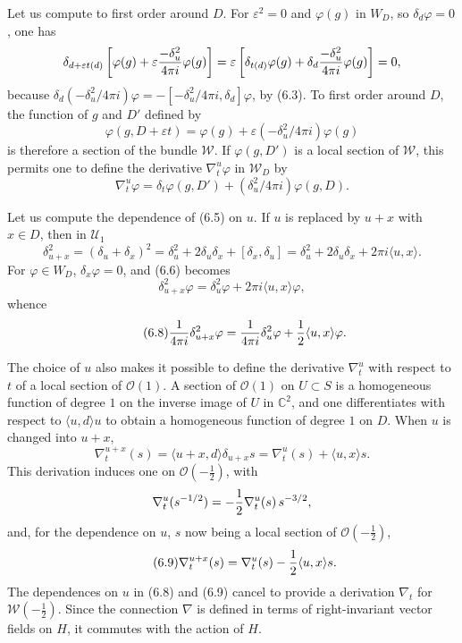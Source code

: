 \documentclass[11pt]{article}
\newcommand{\C}{\mathbb C}
\newcommand{\cO}{\mathcal O}
\newcommand{\cW}{\mathcal W}
\newcommand{\half}{\tfrac12}
\begin{document}
Let us compute to first order around $D$. For $\varepsilon^2=0$ and $\varphi(g)$ in $W_D$, so $\delta_d\varphi=0$, one has
\[
\delta_{d+\varepsilon t(d)}\left[\varphi(g)+\varepsilon{-\delta_u^2\over4\pi i}\varphi(g)\right]
=\varepsilon\left[\delta_{t(d)}\varphi(g)+\delta_d{-\delta_u^2\over4\pi i}\varphi(g)\right]=0,
\]
because $\delta_d(-\delta_u^2/4\pi i)\varphi=-[-\delta_u^2/4\pi i,\delta_d]\varphi$, by (6.3). To first order around $D$, the function of $g$ and $D'$ defined by
\[
\varphi(g,D+\varepsilon t)=\varphi(g)+\varepsilon(-\delta_u^2/4\pi i)\varphi(g)
\]
is therefore a section of the bundle $\cW$. If $\varphi(g,D')$ is a local section of $\cW$, this permits one to define the derivative $\nabla^u_t\varphi$ in $\cW_D$ by
\begin{equation}\tag{6.5}
\nabla^u_t\varphi=\delta_t\varphi(g,D')+(\delta_u^2/4\pi i)\varphi(g,D).
\end{equation}

Let us compute the dependence of (6.5) on $u$. If $u$ is replaced by $u+x$ with $x\in D$, then in $\mathcal U_1$
\begin{equation}\tag{6.6}
\delta_{u+x}^2=(\delta_u+\delta_x)^2=\delta_u^2+2\delta_u\delta_x+[\delta_x,\delta_u]
=\delta_u^2+2\delta_u\delta_x+2\pi i\langle u,x\rangle.
\end{equation}
For $\varphi\in W_D$, $\delta_x\varphi=0$, and (6.6) becomes
\begin{equation}\tag{6.7}
\delta_{u+x}^2\varphi=\delta_u^2\varphi+2\pi i\langle u,x\rangle\varphi,
\end{equation}
whence
\begin{equation}\tag{6.8}
{1\over4\pi i}\delta_{u+x}^2\varphi={1\over4\pi i}\delta_u^2\varphi+{1\over2}\langle u,x\rangle\varphi.
\end{equation}

The choice of $u$ also makes it possible to define the derivative $\nabla^u_t$ with respect to $t$ of a local section of $\cO(1)$. A section of $\cO(1)$ on $U\subset S$ is a homogeneous function of degree $1$ on the inverse image of $U$ in $\C^2$, and one differentiates with respect to $\langle u,d\rangle u$ to obtain a homogeneous function of degree $1$ on $D$. When $u$ is changed into $u+x$,
\[
\nabla^{u+x}_t(s)=\langle u+x,d\rangle\delta_{u+x}s
=\nabla^u_t(s)+\langle u,x\rangle s.
\]
This derivation induces one on $\cO(-\half)$, with
\[
\nabla^u_t(s^{-1/2})=-{1\over2}\nabla^u_t(s)\,s^{-3/2},
\]
and, for the dependence on $u$, $s$ now being a local section of $\cO(-\half)$,
\begin{equation}\tag{6.9}
\nabla^{u+x}_t(s)=\nabla^u_t(s)-{1\over2}\langle u,x\rangle s.
\end{equation}
The dependences on $u$ in (6.8) and (6.9) cancel to provide a derivation $\nabla_t$ for $\cW(-\half)$. Since the connection $\nabla$ is defined in terms of right-invariant vector fields on $H$, it commutes with the action of $H$.
\end{document}

